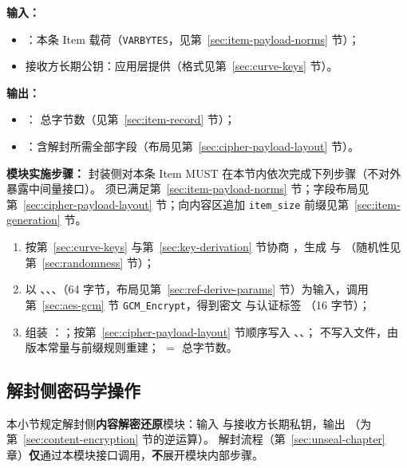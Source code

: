 \textbf{输入：}
\begin{itemize}
  \item {}：本条 Item 载荷（\texttt{VARBYTES}，见第~\ref{sec:item-payload-norms} 节）；
  \item 接收方长期公钥：应用层提供（格式见第~\ref{sec:curve-keys} 节）。
\end{itemize}

\textbf{输出：}
\begin{itemize}
  \item {}： 总字节数（见第~\ref{sec:item-record} 节）；
  \item {}：含解封所需全部字段（布局见第~\ref{sec:cipher-payload-layout} 节）。
\end{itemize}

\textbf{模块实施步骤：}\label{sec:seal-item-crypto}
封装侧对本条 Item MUST 在本节内依次完成下列步骤（不对外暴露中间量接口）。 须已满足第~\ref{sec:item-payload-norms} 节；字段布局见第~\ref{sec:cipher-payload-layout} 节；向内容区追加 \texttt{item\_size} 前缀见第~\ref{sec:item-generation} 节。
\begin{enumerate}
  \item 按第~\ref{sec:curve-keys} 与第~\ref{sec:key-derivation} 节协商 ，生成  与 （随机性见第~\ref{sec:randomness} 节）；
  \item 以 、、、（64 字节，布局见第~\ref{sec:ref-derive-params} 节）为输入，调用第~\ref{sec:aes-gcm} 节 \texttt{GCM\_Encrypt}，得到密文  与认证标签 （16 字节）；
  \item 组装 ：；按第~\ref{sec:cipher-payload-layout} 节顺序写入 、、； 不写入文件，由版本常量与前缀规则重建； $=$  总字节数。
\end{enumerate}

\subsection{解封侧密码学操作}\label{sec:decrypt-crypto}
本小节规定解封侧\textbf{内容解密还原}模块：输入  与接收方长期私钥，输出 （为第~\ref{sec:content-encryption} 节的逆运算）。
解封流程（第~\ref{sec:unseal-chapter} 章）\textbf{仅}通过本模块接口调用，\textbf{不}展开模块内部步骤。

